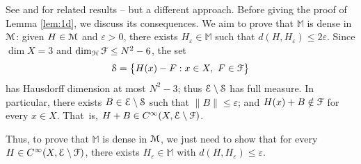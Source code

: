 \documentclass[11pt]{article}
\numberwithin{equation}{section}
\let\pazocal\EuScript
\let\sep:
\theoremstyle{definition}
\newcommand{\FF}{\pazocal{F}}
\newcommand{\EE}{\pazocal{E}}
\newcommand{\MM}{\pazocal{M}}
\newcommand{\HH}{\pazocal{H}}
\newcommand{\SSS}{{\pazocal{S}}}
\newcommand{\Mm}{\mathbb{M}}
\let\epsi\varepsilon
\begin{document}
See \cite[\S2]{AS78} and \cite[\S3]{DE99} for related results -- but a different approach.
Before giving the proof of Lemma \ref{lem:1d}, we discuss its consequences. We aim to prove that $\Mm$ is dense in $\MM$: given $H \in \MM$ and $\epsi > 0$, there exists $H_\epsi \in \Mm$ such that $d(H,H_\epsi) \leq 2\epsi$. Since $\dim X = 3$ and $\dim_\HH \FF \leq N^2-6$, the set
\begin{equation*}
\SSS = \bigl\{ H(x) - F \sep x \in X, \ F \in \FF\bigr\}
\end{equation*}
has Hausdorff dimension at most $N^2-3$; thus $\EE \setminus \SSS$ has full measure. In particular, there exists $B \in \EE \setminus \SSS$ such that $\| B \| \leq \epsi$; and $H(x) + B \notin \FF$ for every $x \in X$. That~is, $H+B \in C^\infty(X,\EE\setminus \FF)$.

Thus, to prove that $\Mm$ is dense in $\MM$, we just need to show that for every $H \in C^\infty(X,\EE\setminus\FF)$, there exists $H_\epsi \in \Mm$ with $d(H,H_\epsi) \leq \epsi$.
\end{document}
